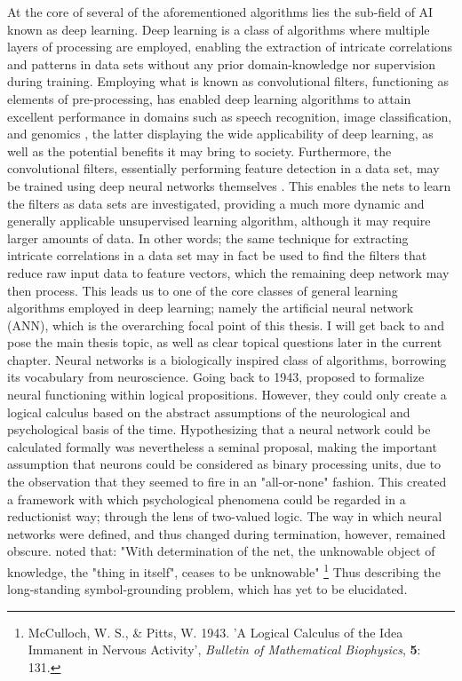 At the core of several of the aforementioned algorithms lies the sub-field of AI known as deep learning. Deep learning is a class of algorithms where multiple layers of processing are employed, enabling the extraction of intricate correlations and patterns in data sets without any prior domain-knowledge nor supervision during training. Employing what is known as convolutional filters, functioning as elements of pre-processing, has enabled deep learning algorithms to attain excellent performance in domains such as speech recognition, image classification, and genomics \citep{LeCun2015}, the latter displaying the wide applicability of deep learning, as well as the potential benefits it may bring to society. Furthermore, the convolutional filters, essentially performing feature detection in a data set, may be trained using deep neural networks themselves \citep{LeCun2015}. This enables the nets to learn the filters as data sets are investigated, providing a much more dynamic and generally applicable unsupervised learning algorithm, although it may require larger amounts of data. In other words; the same technique for extracting intricate correlations in a data set may in fact be used to find the filters that reduce raw input data to feature vectors, which the remaining deep network may then process. This leads us to one of the core classes of general learning algorithms employed in deep learning; namely the artificial neural network (ANN), which is the overarching focal point of this thesis. I will get back to and pose the main thesis topic, as well as clear topical questions later in the current chapter.
Neural networks is a biologically inspired class of algorithms, borrowing its vocabulary from neuroscience. Going back to 1943, \cite{McCulloch1943} proposed to formalize neural functioning within logical propositions.
However, they could only create a logical calculus based on the abstract assumptions of the neurological and psychological basis of the time. Hypothesizing that a neural network could be calculated formally was nevertheless a seminal proposal, making the important assumption that neurons could be considered as binary processing units, due to the observation that they seemed to fire in an "all-or-none" fashion. This created a framework with which psychological phenomena could be regarded in a reductionist way; through the lens of two-valued logic. The way in which neural networks were defined, and thus changed during termination, however, remained obscure. \cite{McCulloch1943} noted that: "With determination of the net, the unknowable object of knowledge, the "thing in itself", ceases to be unknowable"
\footnote{McCulloch, W. S., \& Pitts, W. 1943. 'A Logical Calculus of the Idea Immanent in Nervous Activity', \textit{Bulletin of Mathematical Biophysics}, \textbf{5}: 131.}
Thus describing the long-standing symbol-grounding problem, which has yet to be elucidated.

